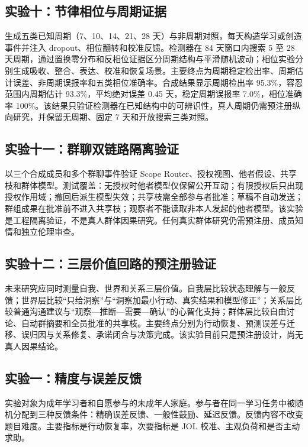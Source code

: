 \documentclass[UTF8,a4paper,11pt]{ctexart}
\begin{document}
\subsection{实验十：节律相位与周期证据}

生成五类已知周期（7、10、14、21、28 天）与非周期对照，每天构造学习或创造事件并注入 dropout、相位翻转和校准反馈。检测器在 84 天窗口内搜索 5 至 28 天周期，通过置换零分布和反相位证据区分周期结构与平滑随机波动；相位实验分别生成吸收、整合、表达、校准和恢复场景。主要终点为周期稳定检出率、周期估计误差、非周期误报率和五类相位准确率。合成结果显示周期检出率 95.3\%，容忍范围内周期估计 93.3\%，平均绝对误差 0.45 天，稳定周期误报率 7.0\%，相位准确率 100\%。该结果只验证检测器在已知结构中的可辨识性，真人周期仍需预注册纵向研究，并保留无周期、固定 7 天和开放搜索三类对照。

\subsection{实验十一：群聊双链路隔离验证}

以三个合成成员和多个群聊事件验证 Scope Router、授权视图、他者假设、共享枝和群体模型。测试覆盖：无授权时他者模型仅保留公开互动；有限授权后只出现授权作用域；撤回后派生模型失效；共享枝需全部参与者批准；草稿不自动发送；群组成果在批准前不进入共享枝；观察者不能读取非本人发起的他者模型。该实验是工程隔离验证，不是真人群体因果研究。任何真实群体研究仍需预注册、成员知情和独立伦理审查。

\subsection{实验十二：三层价值回路的预注册验证}

未来研究应同时测量自我、世界和关系三层价值。自我层比较状态理解与一般反馈；世界层比较“只给洞察”与“洞察加最小行动、真实结果和模型修正”；关系层比较普通沟通建议与“观察—推断—需要—确认”的心智化支持；群体层比较自由讨论、自动群摘要和全员批准的共享枝。主要终点分别为行动恢复、预测误差与迁移、误归因与关系修复、承诺闭合与决策完成。该实验目前只是预注册设计，尚无真人因果结论。

\subsection{实验一：精度与误差反馈}

实验对象为成年学习者和自愿参与的未成年人家庭。参与者在同一学习任务中被随机分配到三种反馈条件：精确误差反馈、一般性鼓励、延迟反馈。反馈内容不改变题目难度。主要指标是行动恢复率，次要指标是 JOL 校准、主观负荷和是否主动求助。
\end{document}
